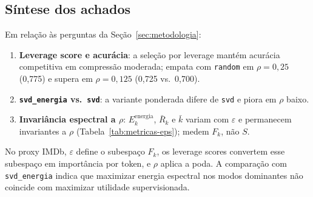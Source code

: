 \subsection{Síntese dos achados}

Em relação às perguntas da Seção~\ref{sec:metodologia}:
\begin{enumerate}
    \item \textbf{Leverage score e acurácia}: a seleção por leverage mantém acurácia competitiva em compressão moderada; empata com \texttt{random} em $\rho=0{,}25$ (0,775) e supera em $\rho=0{,}125$ (0,725 vs.\ 0,700).
    \item \textbf{\texttt{svd\_energia} vs.\ \texttt{svd}}: a variante ponderada difere de \texttt{svd} e piora em $\rho$ baixo.
    \item \textbf{Invariância espectral a $\rho$}: $E_k^{\mathrm{energia}}$, $\bar{R}_k$ e $\bar{k}$ variam com $\varepsilon$ e permanecem invariantes a $\rho$ (Tabela~\ref{tab:metricas-eps}); medem $F_k$, não $S$.
\end{enumerate}

No proxy IMDb, $\varepsilon$ define o subespaço $F_k$, os leverage scores convertem esse subespaço em importância por token, e $\rho$ aplica a poda. A comparação com \texttt{svd\_energia} indica que maximizar energia espectral nos modos dominantes não coincide com maximizar utilidade supervisionada.
